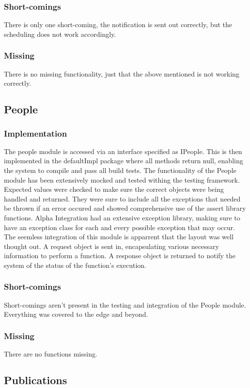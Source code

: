 \documentclass{article}
\begin{document}
        \subsubsection{Short-comings}
        There is only one short-coming, the notification is sent out correctly, but the scheduling does not work accordingly. 
        \subsubsection{Missing}
        There is no missing functionality, just that the above mentioned is not working correctly.
    \subsection{People}
        \subsubsection{Implementation}
		The people module is accessed via an interface specified as IPeople. This is then implemented in the defaultImpl package where all methods return null, enabling the system to compile and pass all build tests. The functionality of the People module has been extensively mocked and tested withing the testing framework. Expected values were checked to make sure the correct objects were being handled and returned. They were sure to include all the exceptions that needed be thrown if an error occured and showed comprehensive use of the assert library functions. Alpha Integration had an extensive exception library, making sure to have an exception class for each and every possible exception that may occur. The seemless integration of this module is apparrent that the layout was well thought out. A request object is sent in, encapsulating various necessary information to perform a function. A response object is returned to notify the system of the status of the function's execution.
		\subsubsection{Short-comings}
		Short-comings aren't present in the testing and integration of the People module. Everything was covered to the edge and beyond.
		\subsubsection{Missing}
		There are no functions missing.
		
	\subsection{Publications}
\end{document}
